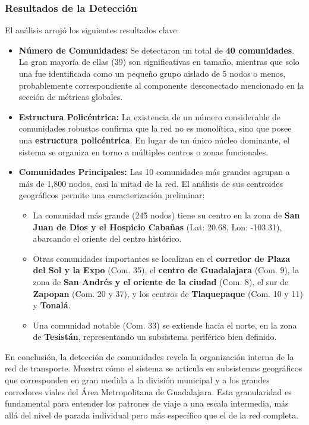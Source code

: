         \subsubsection{Resultados de la Detección}
            El análisis arrojó los siguientes resultados clave:
            \begin{itemize}
                \item \textbf{Número de Comunidades:} Se detectaron un total de \textbf{40 comunidades}. La gran mayoría de ellas (39) son significativas en tamaño, mientras que solo una fue identificada como un pequeño grupo aislado de 5 nodos o menos, probablemente correspondiente al componente desconectado mencionado en la sección de métricas globales.
                \item \textbf{Estructura Policéntrica:} La existencia de un número considerable de comunidades robustas confirma que la red no es monolítica, sino que posee una \textbf{estructura policéntrica}. En lugar de un único núcleo dominante, el sistema se organiza en torno a múltiples centros o zonas funcionales.
                \item \textbf{Comunidades Principales:} Las 10 comunidades más grandes agrupan a más de 1,800 nodos, casi la mitad de la red. El análisis de sus centroides geográficos permite una caracterización preliminar:
                \begin{itemize}
                    \item La comunidad más grande (245 nodos) tiene su centro en la zona de \textbf{San Juan de Dios y el Hospicio Cabañas} (Lat: 20.68, Lon: -103.31), abarcando el oriente del centro histórico.
                    \item Otras comunidades importantes se localizan en el \textbf{corredor de Plaza del Sol y la Expo} (Com. 35), el \textbf{centro de Guadalajara} (Com. 9), la zona de \textbf{San Andrés y el oriente de la ciudad} (Com. 8), el sur de \textbf{Zapopan} (Com. 20 y 37), y los centros de \textbf{Tlaquepaque} (Com. 10 y 11) y \textbf{Tonalá}.
                    \item Una comunidad notable (Com. 33) se extiende hacia el norte, en la zona de \textbf{Tesistán}, representando un subsistema periférico bien definido.
                \end{itemize}
            \end{itemize}

            En conclusión, la detección de comunidades revela la organización interna de la red de transporte. Muestra cómo el sistema se articula en subsistemas geográficos que corresponden en gran medida a la división municipal y a los grandes corredores viales del Área Metropolitana de Guadalajara. Esta granularidad es fundamental para entender los patrones de viaje a una escala intermedia, más allá del nivel de parada individual pero más específico que el de la red completa.

